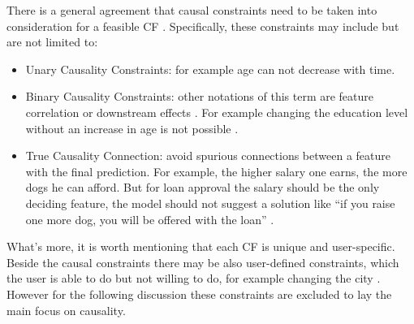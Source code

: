 There is a general agreement that causal constraints need to be taken into consideration for a feasible CF \cite{algorithmicrecourse}. Specifically, these constraints may include but are not limited to:
 \begin{itemize}
   \item Unary Causality Constraints: for example age can not decrease with time.
   \item Binary Causality Constraints: other notations of this term are feature correlation \cite{preservingCausal} or downstream effects \cite{algorithmicrecourse}. For example changing the education level without an increase in age is not possible \cite{DiCE}.
   \item True Causality Connection: avoid spurious connections between a feature with the final prediction. For example, the higher salary one earns, the more dogs he can afford. But for loan approval the salary should be the only deciding feature, the model should not suggest a solution like ``if you raise one more dog, you will be offered with the loan'' \cite{diffThatMakesDiff}.
 \end{itemize}

What's more, it is worth mentioning that each CF is unique and user-specific. Beside the causal constraints there may be also user-defined constraints, which the user is able to do but not willing to do, for example changing the city \cite{preservingCausal}. However for the following discussion these constraints are excluded to lay the main focus on causality.


